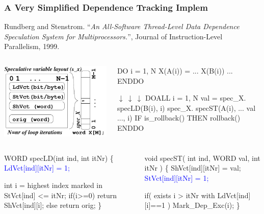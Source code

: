 \documentclass{beamer}
\newcommand{\blue}[1]{\textcolor{Blue}{{#1}}}
\newcommand{\emp}[1]{\textcolor{DikuRed}{ #1}}
\newcommand{\emphh}[1]{\textcolor{CosGreen}{ #1}}
\newcommand{\mymath}[1]{$ #1 $}
\begin{document}
\begin{frame}[fragile]
	\tableofcontents[currentsection]
\end{frame}

\begin{frame}[fragile,t]
  \frametitle{A Very Simplified Dependence Tracking Implem}

Rundberg and Stenstrom. ``{\em An All-Software Thread-Level Data Dependence Speculation System for Multiprocessors.}'', Journal of Instruction-Level Parallelism, 1999.\medskip

\begin{columns}
\includegraphics[width=28ex]{Figures/FigsTLS/SpecMemSeminal.pdf}
\vspace{-2ex}
\begin{colorcode}
\emp{DO} i = 1, N
  \emp{X(A(i))} = ... \emp{X(B(i))} ...
ENDDO

\mymath{\downarrow \ \downarrow \ \downarrow}
\emphh{DOALL} i = 1, N
  val = spec_X.\emphh{specLD(B(i), i)}
  spec_X.\emphh{specST(A(i), ... val ..., i)}
  IF is_rollback() THEN rollback()
ENDDO
\end{colorcode}
\end{columns}
\medskip\pause

\begin{columns}
\begin{colorcode}
\emphh{WORD specLD(int ind, int itNr)} \{
  \blue{LdVct[ind][itNr] = 1;}

  \emp{int i = highest index marked}
          \emp{in StVct[ind] <= itNr;}
  if(i>=0) return ShVct[ind][i];
  else return orig;
\}
\end{colorcode}
\begin{colorcode}
\emphh{void specST( int ind, WORD val, int itNr )} \{  
  ShVct[ind][itNr] = val;            
  \blue{StVct[ind][itNr]  = 1;}
  
  if( \emp{exists i > itNr with} 
         \emp{LdVct[ind][i]==1} )
    \alert{Mark_Dep_Exc(i);}
\}
\end{colorcode}
\end{columns}

\end{frame}
\end{document}
